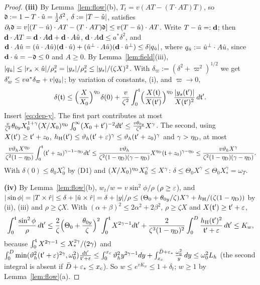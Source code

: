 \begin{proof}
\textbf{(iii)} By Lemma~\ref{lem:flow}(b), $T_t=v(AT-(T\cdot AT)T)$, so $\mathfrak d:=1-T\cdot\hat u=\frac12\delta^2$, $\delta:=|T-\hat u|$,
satisfies $\partial_t\mathfrak d=v[(T-\hat u)\cdot AT-(T\cdot AT)\mathfrak d]\le v(T-\hat u)\cdot AT$. Write $T-\hat u=:\mathbf d$; then
$\mathbf d\cdot AT=\mathbf d\cdot A\mathbf d+\mathbf d\cdot A\hat u$, $\mathbf d\cdot A\mathbf d\le a^*\delta^2$, and $\mathbf d\cdot A\hat u=(\hat u\cdot A\hat u)(\mathbf d\cdot\hat u)+(\hat u^\perp\cdot A\hat u)(\mathbf d\cdot\hat u^\perp)
\le\delta|q_{\hat u}|$, where $q_{\hat u}:=\hat u^\perp\cdot A\hat u$, since $\mathbf d\cdot\hat u=-\mathfrak d\le0$ and $A\ge0$. By
Lemma~\ref{lem:field}(iii), $|q_{\hat u}|\le|r_s\times\hat u|/\rho_s^2=|y_s|/\rho_s^2\le|y_s|/(\zeta X)^2$. With
$\delta_\varpi:=(\delta^2+\varpi^2)^{1/2}$ we get $\delta_\varpi'\le va^*\delta_\varpi+v|q_{\hat u}|$; by variation of constants, (i), and
$\varpi\to0$,
\[
\delta(\mathfrak t)\le\Bigl(\frac X{X_0}\Bigr)^{\eta_{\mathrm D}}\delta(0)+\frac v{\zeta^2}\int_0^{\mathfrak t}\Bigl(\frac{X(\mathfrak t)}{X(\mathfrak t')}\Bigr)^{\eta_{\mathrm D}}
\frac{|y_s(\mathfrak t')|}{X(\mathfrak t')^2}\,d\mathfrak t'.
\]
Insert \eqref{eq:dep-y}. The first part contributes at most
$\frac v{\zeta^2}\theta_{0y}X_0^{1+\gamma}(X/X_0)^{\eta_{\mathrm D}}\int_0^\infty(X_0+\mathfrak t')^{-2}d\mathfrak t'\le\frac{v\theta_{0y}}{\zeta^2}X^\gamma$. The
second, using $X(\mathfrak t')\ge\mathfrak t'+z_0$, $h_{\mathrm H}(\mathfrak t')\le\vartheta_h(\mathfrak t'+\varepsilon)^\gamma\le\vartheta_h(\mathfrak t'+z_0)^\gamma$ and $\gamma>\eta_{\mathrm D}$,
at most
\[
\frac{v\vartheta_hX^{\eta_{\mathrm D}}}{\zeta^2(1-\eta_{\mathrm D})}\int_0^{\mathfrak t}(\mathfrak t'+z_0)^{\gamma-1-\eta_{\mathrm D}}d\mathfrak t'
\le\frac{v\vartheta_h}{\zeta^2(1-\eta_{\mathrm D})(\gamma-\eta_{\mathrm D})}X^{\eta_{\mathrm D}}(\mathfrak t+z_0)^{\gamma-\eta_{\mathrm D}}\le\frac{v\vartheta_hX^\gamma}{\zeta^2(1-\eta_{\mathrm D})(\gamma-\eta_{\mathrm D})}.
\]
With $\delta(0)\le\theta_0X_0^\gamma$ by (D1) and $(X/X_0)^{\eta_{\mathrm D}}X_0^\gamma\le X^\gamma$: $\delta\le\Theta_0X^\gamma\le\Theta_0X_*^\gamma=\omega_T$.

\textbf{(iv)} By Lemma~\ref{lem:flow}(b), $w_t/w=v\sin^2\!\phi/\rho$ ($\rho\ge\varepsilon$), and
$|\sin\phi|=|T\times\hat r|\le\delta+|\hat u\times\hat r|=\delta+|y|/\rho\le(\Theta_0+\theta_{0y}/\zeta)X^\gamma+h_{\mathrm H}/(\zeta(1-\eta_{\mathrm D}))$ by (ii),
(iii) and $\rho\ge\zeta X$. With $(\alpha+\beta)^2\le2\alpha^2+2\beta^2$, $\rho\ge\zeta X$ and $X(\mathfrak t')\ge\mathfrak t'+\varepsilon$,
\[
\int_0^{\mathfrak t}\frac{\sin^2\phi}\rho\,d\mathfrak t'\le\frac2\zeta\Bigl(\Theta_0+\frac{\theta_{0y}}\zeta\Bigr)^2\int_0^{\mathfrak t}X^{2\gamma-1}d\mathfrak t'
+\frac2{\zeta^3(1-\eta_{\mathrm D})^2}\int_0^D\frac{h_{\mathrm H}(\mathfrak t')^2}{\mathfrak t'+\varepsilon}\,d\mathfrak t'\le K_w,
\]
because $\int_0^{\mathfrak t}X^{2\gamma-1}\le X_*^{2\gamma}/(2\gamma)$ and
$\int_0^D\min(\vartheta_h^2(\mathfrak t'+\varepsilon)^{2\gamma},\omega_0^2)\frac{d\mathfrak t'}{\mathfrak t'+\varepsilon}\le\int_0^{x_c}\vartheta_h^2y^{2\gamma-1}dy
+\int_{x_c}^{\bar D+\varepsilon_*}\frac{\omega_0^2}y\,dy\le\omega_0^2L_h$ (the second integral is absent if $\bar D+\varepsilon_*\le x_c$). So
$w\le e^{vK_w}\le1+\delta_t$; $w\ge1$ by Lemma~\ref{lem:flow}(a).


\end{proof}

